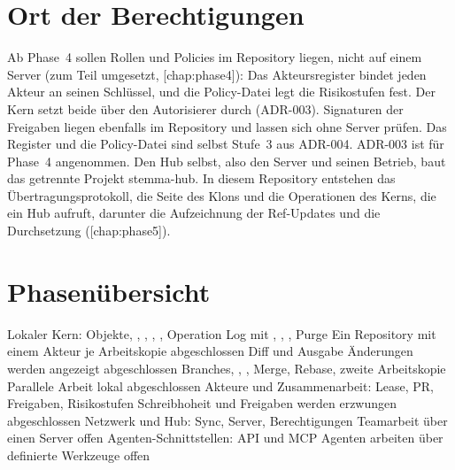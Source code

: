 \section{Ort der Berechtigungen}

Ab Phase~4 sollen Rollen und Policies im Repository liegen, nicht auf einem Server
(zum Teil umgesetzt, [chap:phase4]): Das Akteursregister bindet
jeden Akteur an seinen Schlüssel, und die Policy-Datei legt die Risikostufen fest.
Der Kern setzt beide über den Autorisierer durch (ADR-003).
Signaturen der Freigaben liegen ebenfalls im Repository und lassen sich ohne Server prüfen.
Das Register und die Policy-Datei sind selbst Stufe~3 aus ADR-004.
ADR-003 ist für Phase~4 angenommen.
Den Hub selbst, also den Server und seinen Betrieb, baut das getrennte Projekt stemma-hub.
In diesem Repository entstehen das Übertragungsprotokoll, die Seite des Klons und die
Operationen des Kerns, die ein Hub aufruft, darunter die Aufzeichnung der Ref-Updates und die
Durchsetzung ([chap:phase5]).

\section{Phasenübersicht}

\startplacetable[title={Phasen mit Inhalt und Ergebnis},reference=tab:phases,location={here,force}]
\startxtable[frame=off,split=yes,option=stretch]
\startxtablehead
\startxrow[topframe=on,bottomframe=on]
 \stopxcell
{} \stopxcell
{} \stopxcell
{} \stopxcell
\stopxrow
\stopxtablehead
\startxtablenext
\startxrow[topframe=on,bottomframe=on]
 \stopxcell
{} \stopxcell
{} \stopxcell
{} \stopxcell
\stopxrow
\stopxtablenext
\startxrow
{} \stopxcell
\startxcell Lokaler Kern: Objekte, , , ,
, Operation Log mit , , ,
Purge \stopxcell
\startxcell Ein Repository mit einem Akteur je Arbeitskopie \stopxcell
\startxcell abgeschlossen \stopxcell
\stopxrow
\startxrow
{} \stopxcell
\startxcell Diff und Ausgabe \stopxcell
\startxcell Änderungen werden angezeigt \stopxcell
\startxcell abgeschlossen \stopxcell
\stopxrow
\startxrow
{} \stopxcell
\startxcell Branches, , , Merge, Rebase, zweite Arbeitskopie \stopxcell
\startxcell Parallele Arbeit lokal \stopxcell
\startxcell abgeschlossen \stopxcell
\stopxrow
\startxrow
{} \stopxcell
\startxcell Akteure und Zusammenarbeit: Lease, PR, Freigaben, Risikostufen \stopxcell
\startxcell Schreibhoheit und Freigaben werden erzwungen \stopxcell
\startxcell abgeschlossen \stopxcell
\stopxrow
\startxrow
{} \stopxcell
\startxcell Netzwerk und Hub: Sync, Server, Berechtigungen \stopxcell
\startxcell Teamarbeit über einen Server \stopxcell
\startxcell offen \stopxcell
\stopxrow
\startxrow[topframe=on,bottomframe=on]
 \stopxcell
\startxcell Agenten-Schnittstellen: API und MCP \stopxcell
\startxcell Agenten arbeiten über definierte Werkzeuge \stopxcell
\startxcell offen \stopxcell
\stopxrow
\stopxtable
\stopplacetable
